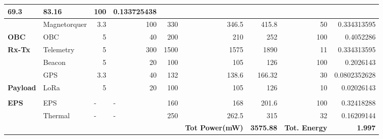 \begin{table}[h]
\begin{adjustbox}{width=\columnwidth,center}
\begin{tabular}{|l|l|r|r|r|r|r|r|r|}
 			69.3 &
 			83.16 &
 			100 &
 			0.133725438 \\ \hline
 			\rowcolor[HTML]{FFE6DD} 
 			&
 			Magnetorquer &
 			3.3 &
 			100 &
 			330 &
 			346.5 &
 			415.8 &
 			50 &
 			0.334313595 \\ \hline
 			\rowcolor[HTML]{FFE6DD} 
 			\textbf{OBC} &
 			OBC &
 			5 &
 			40 &
 			200 &
 			210 &
 			252 &
 			100 &
 			0.4052286 \\ \hline
 			\rowcolor[HTML]{FFE6DD} 
 			\textbf{Rx-Tx} &
 			Telemetry &
 			5 &
 			300 &
 			1500 &
 			1575 &
 			1890 &
 			11 &
 			0.334313595 \\ \hline
 			\rowcolor[HTML]{FFE6DD} 
 			&
 			Beacon &
 			5 &
 			20 &
 			100 &
 			105 &
 			126 &
 			100 &
 			0.2026143 \\ \hline
 			\rowcolor[HTML]{FFE6DD} 
 			&
 			GPS &
 			3.3 &
 			40 &
 			132 &
 			138.6 &
 			166.32 &
 			30 &
 			0.0802352628 \\ \hline
 			\rowcolor[HTML]{FFE6DD} 
 			\textbf{Payload} &
 			LoRa &
 			5 &
 			20 &
 			100 &
 			105 &
 			126 &
 			10 &
 			0.02026143 \\ \hline
 			\rowcolor[HTML]{FFE6DD} 
 			&
 			&
 			\multicolumn{1}{l|}{\cellcolor[HTML]{FFE6DD}} &
 			\multicolumn{1}{l|}{\cellcolor[HTML]{FFE6DD}} &
 			\multicolumn{1}{l|}{\cellcolor[HTML]{FFE6DD}} &
 			\multicolumn{1}{l|}{\cellcolor[HTML]{FFE6DD}} &
 			\multicolumn{1}{l|}{\cellcolor[HTML]{FFE6DD}} &
 			\multicolumn{1}{l|}{\cellcolor[HTML]{FFE6DD}} &
 			\multicolumn{1}{l|}{\cellcolor[HTML]{FFE6DD}} \\ \hline
 			\rowcolor[HTML]{FFE6DD} 
 			\textbf{EPS} &
 			EPS &
 			\multicolumn{1}{l|}{\cellcolor[HTML]{FFE6DD}-} &
 			\multicolumn{1}{l|}{\cellcolor[HTML]{FFE6DD}-} &
 			160 &
 			168 &
 			201.6 &
 			100 &
 			0.32418288 \\ \hline
 			\rowcolor[HTML]{FFE6DD} 
 			&
 			Thermal &
 			\multicolumn{1}{l|}{\cellcolor[HTML]{FFE6DD}-} &
 			\multicolumn{1}{l|}{\cellcolor[HTML]{FFE6DD}-} &
 			250 &
 			262.5 &
 			315 &
 			32 &
 			0.16209144 \\ \hline
 			\rowcolor[HTML]{FFE6DD} 
 			&
 			&
 			\multicolumn{1}{l|}{\cellcolor[HTML]{FFE6DD}} &
 			\multicolumn{1}{l|}{\cellcolor[HTML]{FFE6DD}} &
 			\multicolumn{1}{l|}{\cellcolor[HTML]{FFE6DD}} &
 			\multicolumn{1}{l|}{\cellcolor[HTML]{FFE6DD}\textbf{Tot Power(mW)}} &
 			\textbf{3575.88} &
 			\multicolumn{1}{l|}{\cellcolor[HTML]{FFE6DD}\textbf{Tot. Energy}} &
 			\textbf{1.997} \\ \hline
 		\end{tabular}
 	\end{adjustbox}
 \end{table}

